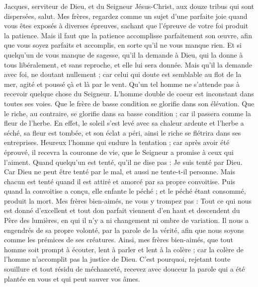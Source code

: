 \begin{multicols}{2}
\VerseOne{}Jacques, serviteur de Dieu, et du Seigneur Jésus-Christ, aux douze tribus qui sont dispersées, salut.
Mes frères, regardez comme un sujet d'une parfaite joie quand vous êtes exposés à diverses épreuves,
sachant que l'épreuve de votre foi produit la patience.
Mais il faut que la patience accomplisse parfaitement son œuvre, afin que vous soyez parfaits et accomplis, en sorte qu'il ne vous manque rien.
Et si quelqu'un de vous manque de sagesse, qu'il la demande à Dieu, qui la donne à tous libéralement, et sans reproche, et elle lui sera donnée.
Mais qu'il la demande avec foi, ne doutant nullement ; car celui qui doute est semblable au flot de la mer, agité et poussé çà et là par le vent.
Qu'un tel homme ne s'attende pas à recevoir quelque chose du Seigneur.
L'homme double de coeur est inconstant dans toutes ses voies.
Que le frère de basse condition se glorifie dans son élévation.
Que le riche, au contraire, se glorifie dans sa basse condition ; car il passera comme la fleur de l'herbe.
En effet, le soleil s'est levé avec sa chaleur ardente et l'herbe a séché, sa fleur est tombée, et son éclat a péri, ainsi le riche se flétrira dans ses entreprises.
Heureux l'homme qui endure la tentation ; car après avoir été éprouvé, il recevra la couronne de vie, que le Seigneur a promise à ceux qui l'aiment.
Quand quelqu'un est tenté, qu'il ne dise pas : Je suis tenté par Dieu. Car Dieu ne peut être tenté par le mal, et aussi ne tente-t-il personne.
Mais chacun est tenté quand il est attiré et amorcé par sa propre convoitise.
Puis quand la convoitise a conçu, elle enfante le péché ; et le péché étant consommé, produit la mort.
Mes frères bien-aimés, ne vous y trompez pas :
Tout ce qui nous est donné d'excellent et tout don parfait viennent d'en haut et descendent du Père des lumières, en qui il n'y a ni changement ni ombre de variation.
Il nous a engendrés de sa propre volonté, par la parole de la vérité, afin que nous soyons comme les prémices de ses créatures.
Ainsi, mes frères bien-aimés, que tout homme soit prompt à écouter, lent à parler et lent à la colère ;
car la colère de l'homme n'accomplit pas la justice de Dieu.
C'est pourquoi, rejetant toute souillure et tout résidu de méchanceté, recevez avec douceur la parole qui a été plantée en vous et qui peut sauver vos âmes.

\end{multicols}

